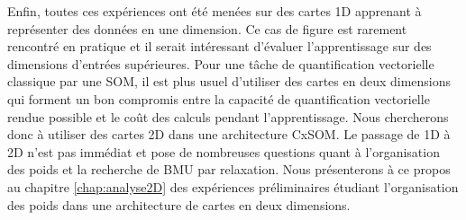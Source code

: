 \documentclass[../main]{subfiles}
\begin{document}
Enfin, toutes ces expériences ont été menées sur des cartes 1D apprenant à représenter des données en une dimension. Ce cas de figure est rarement rencontré en pratique et il serait intéressant d'évaluer l'apprentissage sur des dimensions d'entrées supérieures. Pour une tâche de quantification vectorielle classique par une SOM, il est plus usuel d'utiliser des cartes en deux dimensions qui forment un bon compromis entre la capacité de quantification vectorielle rendue possible et le coût des calculs pendant l'apprentissage. Nous chercherons donc à utiliser des cartes 2D dans une architecture CxSOM. Le passage de 1D à 2D n'est pas immédiat et pose de nombreuses questions quant à l'organisation des poids et la recherche de BMU par relaxation. Nous présenterons à ce propos au chapitre \ref{chap:analyse2D} des expériences préliminaires étudiant l'organisation des poids dans une architecture de cartes en deux dimensions.

\ifSubfilesClassLoaded{
    \printbibliography
}{}
\end{document}
